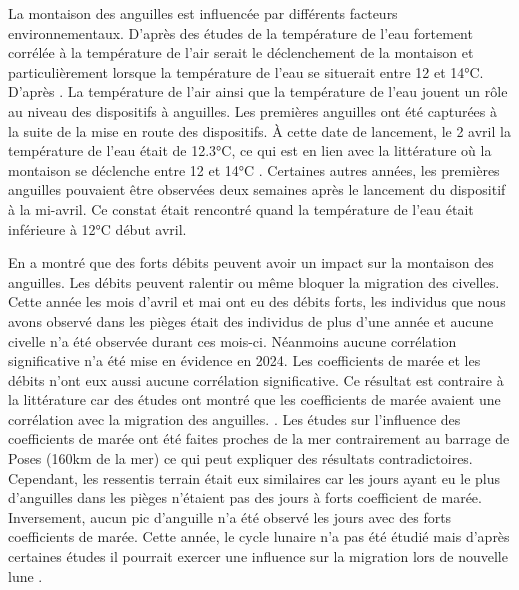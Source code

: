 \documentclass[11pt,titlepage,twoside]{article}\usepackage[]{graphicx}\usepackage[table]{xcolor}
\begin{document}
\vspace{0.5cm}
La montaison des anguilles est influencée par différents facteurs environnementaux. D’après des études de \citep{white_environmental_1997} la température de l’eau fortement corrélée à la température de l’air serait le déclenchement de la montaison et particulièrement lorsque la température de l’eau se situerait entre 12 et 14°C. D’après \citep{adam_anguille_2008}. La température de l’air ainsi que la température de l’eau jouent un rôle au niveau des dispositifs à anguilles. Les premières anguilles ont été capturées à la suite de la mise en route des dispositifs. À cette date de lancement, le 2 avril la température de l’eau était de 12.3°C, ce qui est en lien avec la littérature où la montaison se déclenche entre 12 et 14°C \citep{white_environmental_1997}. Certaines autres années, les premières anguilles pouvaient être observées deux semaines après le lancement du dispositif à la mi-avril. Ce constat était rencontré quand la température de l’eau était inférieure à 12°C début avril.

\vspace{0.5cm}
En \citep{hirschinger_donnees_2015} a montré que des forts débits peuvent avoir un impact sur la montaison des anguilles. Les débits peuvent ralentir ou même bloquer la migration des civelles. Cette année les mois d’avril et mai ont eu des débits forts, les individus que nous avons observé dans les pièges était des individus de plus d’une année et aucune civelle n’a été observée durant ces mois-ci. Néanmoins aucune corrélation significative n’a été mise en évidence en 2024. Les coefficients de marée et les débits n’ont eux aussi aucune corrélation significative. Ce résultat est contraire à la littérature car des études ont montré que les coefficients de marée avaient une corrélation avec la migration des anguilles. \citep{gascuel_flow-carried_1986, elie_migration_1994}. Les études sur l’influence des coefficients de marée ont été faites proches de la mer contrairement au barrage de Poses (160km de la mer) ce qui peut expliquer des résultats contradictoires.  Cependant, les ressentis terrain était eux similaires car les jours ayant eu le plus d’anguilles dans les pièges n’étaient pas des jours à forts coefficient de marée. Inversement, aucun pic d’anguille n’a été observé les jours avec des forts coefficients de marée. Cette année, le cycle lunaire n’a pas été étudié mais d’après certaines études il pourrait exercer une influence sur la migration lors de nouvelle lune \citep{casamajor_fluctuations_2001}.
\end{document}
